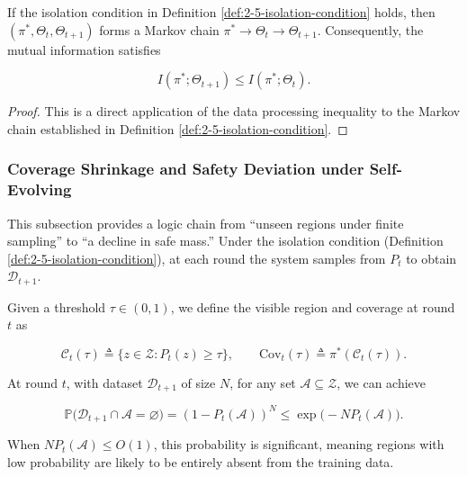 \begin{lemma}\label{lem:2-3-information-monotonicity-under-isolation}

If the isolation condition in Definition \ref{def:2-5-isolation-condition} holds, then $(\pi^\ast,\Theta_t,\Theta_{t+1})$ forms a Markov chain $\pi^\ast \to \Theta_t \to \Theta_{t+1}$. Consequently, the mutual information satisfies

\[
I(\pi^\ast;\Theta_{t+1})\le I(\pi^\ast;\Theta_t).
\]

\begin{proof}
This is a direct application of the data processing inequality to the Markov chain established in Definition \ref{def:2-5-isolation-condition}.
\end{proof}
\end{lemma}

\subsubsection{Coverage Shrinkage and Safety Deviation under Self-Evolving}
\label{sec:2-6-coverage-loss-and-safety-deviation-under-recursive-training}

This subsection provides a logic chain from ``unseen regions under finite sampling'' to ``a decline in safe mass.''
Under the isolation condition (Definition \ref{def:2-5-isolation-condition}), at each round the system samples from $P_t$ to obtain $\mathcal{D}_{t+1}$.

\begin{definition}\label{def:2-9-visible-region-and-coverage}

Given a threshold $\tau\in(0,1)$, we define the visible region and coverage at round $t$ as

\[
\mathcal{C}_t(\tau)\triangleq \{z\in\mathcal{Z}: P_t(z)\ge \tau\},\qquad \mathrm{Cov}_t(\tau)\triangleq \pi^\ast(\mathcal{C}_t(\tau)).
\]
\end{definition}

\begin{lemma}\label{lem:2-4-absence-probability-bound-from-finite-sampling}

At round $t$, with dataset $\mathcal{D}_{t+1}$ of size $N$, for any set $\mathcal{A}\subseteq\mathcal{Z}$, we can achieve

\[
\mathbb{P}\bigl(\mathcal{D}_{t+1}\cap \mathcal{A}=\varnothing\bigr)
=(1-P_t(\mathcal{A}))^N
\le \exp\!\bigl(-N P_t(\mathcal{A})\bigr).
\]

When $N P_t(\mathcal{A})\le O(1)$, this probability is significant, meaning regions with low probability are likely to be entirely absent from the training data.
\end{lemma}

